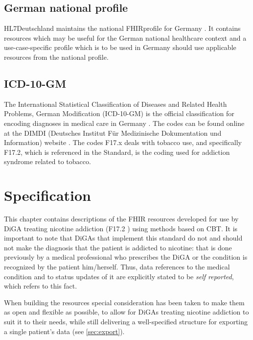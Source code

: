 \documentclass{report}
\newcommand{\fhir}{FHIR\textsuperscript{\textregistered}}
\newcommand{\hl}{HL7\textsuperscript{\textregistered}}
\begin{document}
\section{German national profile}
\hl Deutschland \cite{hlde} maintains the national \fhir profile for Germany \cite{debasis}. It contains resources which may be useful for the German national healthcare context and a use-case-specific profile which is to be used in Germany should use applicable resources from the national profile.

\section{ICD-10-GM}

The International Statistical Classification of Diseases and Related Health Problems, German Modification (ICD-10-GM) is the official classification for encoding diagnoses in medical care in Germany \cite{icd}.
The codes can be found online at the DIMDI (Deutsches Institut Für Medizinische Dokumentation und Information) website \cite{dimdi}. The codes F17.x deals with tobacco use, and specifically F17.2, which is referenced in the Standard,
is the coding used for addiction syndrome related to tobacco.


\chapter{Specification}
\label{ch:spec}

This chapter contains descriptions of the FHIR resources developed for use by DiGA treating nicotine addiction (F17.2 \cite{dimdi}) using methods based on CBT. It is important to note that DiGAs that implement this standard do not and should not
make the diagnosis that the patient is addicted to nicotine: that is done previously by a medical professional who prescribes the DiGA or the condition is recognized by the patient him/herself.
Thus, data references to the medical condition and to status updates of it are explicitly stated to be \textit{self reported}, which refers to this fact.

When building the resources special consideration has been taken to make them as open and flexible as possible, to allow for DiGAs treating nicotine addiction to suit it to their needs, while still delivering a
well-specified structure for exporting a single patient's data (see \ref{sec:export}).
\end{document}
